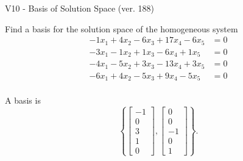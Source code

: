 \begin{exercise}
  \begin{exerciseTitle}V10 - Basis of Solution Space (ver. 188)\end{exerciseTitle}
  \begin{exerciseStatement}
    Find a basis for the solution space of the homogeneous system 
\begin{align*}
 -1 x_ 1 + 4 x_ 2 -6 x_ 3 + 17 x_ 4 -6 x_ 5 &= 0  \\ 
  -3 x_ 1 -1 x_ 2 + 1 x_ 3 -6 x_ 4 + 1 x_ 5 &= 0  \\ 
  -4 x_ 1 -5 x_ 2 + 3 x_ 3 -13 x_ 4 + 3 x_ 5 &= 0  \\ 
  -6 x_ 1 + 4 x_ 2 -5 x_ 3 + 9 x_ 4 -5 x_ 5 &= 0  \\ 
 \end{align*}


 
  \end{exerciseStatement}

  \begin{exerciseAnswer}
   A basis is   
\[\left\{\left[\begin{array}{c}
-1 \\
0 \\
3 \\
1 \\
0
\end{array}\right] , \left[\begin{array}{c}
0 \\
0 \\
-1 \\
0 \\
1
\end{array}\right]\right\}.\]

  


  \end{exerciseAnswer}
\end{exercise}